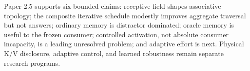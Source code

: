 Paper 2.5 supports six bounded claims: receptive field shapes associative topology; the composite
iterative schedule modestly improves aggregate traversal but not answers; ordinary memory is distractor
dominated; oracle memory is useful to the frozen consumer; controlled activation, not absolute
consumer incapacity, is a leading unresolved problem; and adaptive effort is next.  Physical K/V
disclosure, adaptive control, and learned robustness remain separate research programs.
